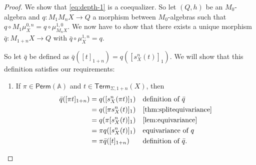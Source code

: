 \documentclass[11pt,a4paper]{amsart}
\newcommand{\Perm}{\mathsf{Perm}(\Names)}
\newcommand{\Term}{\mathsf{Term}}
\newcommand{\sig}{\Sigma}
\newcommand{\Names}{\mathbb{A}}
\theoremstyle{plain}
\numberwithin{equation}{section}
\newcommand{\+}[1]{\mathcal{#1}\xspace}
\theoremstyle{definition}
\begin{document}
\begin{proof}
    We show that \eqref{eq:depth-1} is a coequalizer.
    So let \((Q, h)\) be an \(M_0\)-algebra and
    \(q: M_1 M_n X \to Q\) a morphism between \(M_0\)-algebras such
    that \(q \circ M_1 \mu^{0, n}_X = q \circ \mu^{1, 0}_{M_n X}\).
    We now have to show that there exists a unique morphism
    \(\bar{q}: M_{1 + n} X \to Q\) with
    \(\bar{q} \circ \mu^{1, n}_X = q\).

    So let \(\bar{q}\) be defined as \(\bar{q}([t]_{1 + n}) = q([s^n_X(t)]_1)\).
    We will show that this definition satisfies our requirements:
    \begin{enumerate}[wide]
        \item \label{itm:coequalizerequivariance}
            If \(\pi \in \Perm\) and \(t \in \Term_{\sig, 1 + n}(X)\), then
            \begin{align*}
                \bar{q}([\pi t]_{1 + n})
                &= q([s^n_X(\pi t)]_1) && \text{definition of } \bar{q} \\
                &= q([\pi s^n_X(t)]_1) && \text{\cref{thm:splitequivariance}} \\
                &= q(\pi[s^n_X(t)]_1) && \text{\cref{lem:equivariance}} \\
                &= \pi q([s^n_X(t)]_1) && \text{equivariance of } q \\
                &= \pi \bar{q}([t]_{1 + n}) && \text{definition of } \bar{q}.
            \end{align*}


\end{enumerate}
\end{proof}
\end{document}
